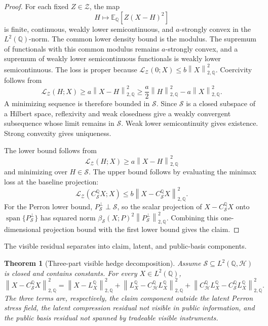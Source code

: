 \documentclass[11pt,a4paper]{amsart}
\theoremstyle{plain}
\newtheorem{theorem}{Theorem}[section]
\theoremstyle{definition}
\theoremstyle{remark}
\DeclareMathOperator{\Span}{span}
\newcommand{\QQ}{\mathbb{Q}}
\newcommand{\EE}{\mathbb{E}}
\newcommand{\cH}{\mathcal{H}}
\newcommand{\cS}{\mathcal{S}}
\newcommand{\cZ}{\mathcal{Z}}
\newcommand{\norm}[1]{\left\lVert #1\right\rVert}
\begin{document}
\begin{proof}
For each fixed \(Z\in\cZ\), the map
\[
        H\mapsto \EE_\QQ[Z(X-H)^2]
\]
is finite, continuous, weakly lower semicontinuous, and \(a\)-strongly convex in the
\(L^2(\QQ)\)-norm.  The common lower density bound is the modulus.  The supremum of functionals
with this common modulus remains \(a\)-strongly convex, and a supremum of weakly lower
semicontinuous functionals is weakly lower semicontinuous.  The loss is proper because
\(\mathcal L_{\cZ}(0;X)\le b\norm{X}_{2,\QQ}^2\).  Coercivity follows from
\[
        \mathcal L_{\cZ}(H;X)
        \ge
        a\norm{X-H}_{2,\QQ}^2
        \ge
        \frac a2\norm{H}_{2,\QQ}^2-a\norm{X}_{2,\QQ}^2.
\]
A minimizing sequence is therefore bounded in \(\cS\).  Since \(\cS\) is a closed subspace of a
Hilbert space, reflexivity and weak closedness give a weakly convergent subsequence whose limit
remains in \(\cS\).  Weak lower semicontinuity gives existence.  Strong convexity gives
uniqueness.

The lower bound follows from
\[
        \mathcal L_{\cZ}(H;X)
        \ge
        a\norm{X-H}_{2,\QQ}^2
\]
and minimizing over \(H\in\cS\).  The upper bound follows by evaluating the minimax loss at the
baseline projection:
\[
        \mathcal L_{\cZ}(C_{\cS}^{\QQ}X;X)
        \le
        b\norm{X-C_{\cS}^{\QQ}X}_{2,\QQ}^2.
\]
For the Perron lower bound, \(P_{\cS}^{\perp}\perp\cS\), so the scalar projection of
\(X-C_{\cS}^{\QQ}X\) onto \(\Span\{P_{\cS}^{\perp}\}\) has squared norm
\(\beta_{\cS}(X;P)^2\norm{P_{\cS}^{\perp}}_{2,\QQ}^2\).  Combining this one-dimensional
projection bound with the first lower bound gives the claim.
\end{proof}

The visible residual separates into claim, latent, and public-basis components.

\begin{theorem}[Three-part visible hedge decomposition]\label{thm:three-part-hedge}
Assume \(\cS\subseteq L^2(\QQ,\cH)\) is closed and contains constants.  For every
\(X\in L^2(\QQ)\),
\[
        \norm{X-C_{\cS}^{\QQ}X}_{2,\QQ}^2
        =
        \norm{X-L_X^\QQ}_{2,\QQ}^2
        +
        \norm{L_X^\QQ-C_{\cH}^{\QQ}L_X^\QQ}_{2,\QQ}^2
        +
        \norm{C_{\cH}^{\QQ}L_X^\QQ-C_{\cS}^{\QQ}L_X^\QQ}_{2,\QQ}^2.
\]
The three terms are, respectively, the claim component outside the latent Perron stress field, the
latent compression residual not visible in public information, and the public basis residual not
spanned by tradeable visible instruments.
\end{theorem}
\end{document}
